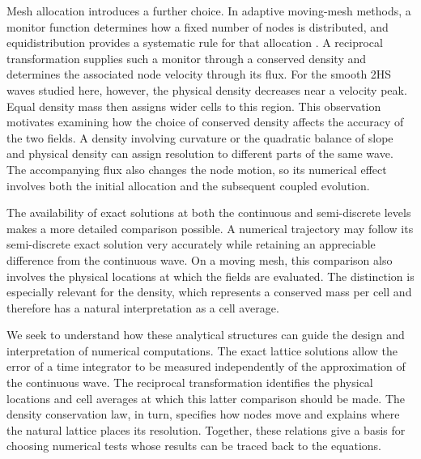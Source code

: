 \documentclass{article}
\begin{document}
Mesh allocation introduces a further choice. In adaptive moving-mesh methods, a monitor function determines how a fixed number of nodes is distributed, and equidistribution provides a systematic rule for that allocation \cite{huang2011}. A reciprocal transformation supplies such a monitor through a conserved density and determines the associated node velocity through its flux. For the smooth 2HS waves studied here, however, the physical density decreases near a velocity peak. Equal density mass then assigns wider cells to this region. This observation motivates examining how the choice of conserved density affects the accuracy of the two fields. A density involving curvature or the quadratic balance of slope and physical density can assign resolution to different parts of the same wave. The accompanying flux also changes the node motion, so its numerical effect involves both the initial allocation and the subsequent coupled evolution.

The availability of exact solutions at both the continuous and semi-discrete levels makes a more detailed comparison possible. A numerical trajectory may follow its semi-discrete exact solution very accurately while retaining an appreciable difference from the continuous wave. On a moving mesh, this comparison also involves the physical locations at which the fields are evaluated. The distinction is especially relevant for the density, which represents a conserved mass per cell and therefore has a natural interpretation as a cell average.

We seek to understand how these analytical structures can guide the design and interpretation of numerical computations. The exact lattice solutions allow the error of a time integrator to be measured independently of the approximation of the continuous wave. The reciprocal transformation identifies the physical locations and cell averages at which this latter comparison should be made. The density conservation law, in turn, specifies how nodes move and explains where the natural lattice places its resolution. Together, these relations give a basis for choosing numerical tests whose results can be traced back to the equations.
\end{document}
